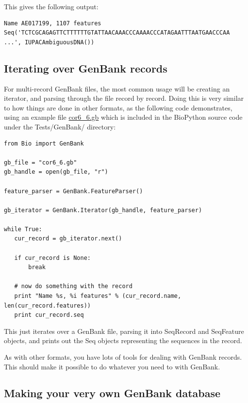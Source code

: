 \documentclass{report}
\begin{document}
This gives the following output:

\begin{verbatim}
Name AE017199, 1107 features
Seq('TCTCGCAGAGTTCTTTTTTGTATTAACAAACCCAAAACCCATAGAATTTAATGAACCCAA ...', IUPACAmbiguousDNA())
\end{verbatim}

\subsection{Iterating over GenBank records}
\label{sec:gb-parsing-iterator}

For multi-record GenBank files, the most common usage will be creating an iterator, and parsing through the file record by record. Doing this is very similar to how things are done in other formats, as the following code demonstrates, using an example file \href{http://cvs.biopython.org/cgi-bin/viewcvs/viewcvs.cgi/*checkout*/biopython/Tests/GenBank/cor6_6.gb?rev=HEAD&cvsroot=biopython&content-type=text/plain}{cor6\_6.gb} which is included in the BioPython source code under the Tests/GenBank/ directory:

\begin{verbatim}
from Bio import GenBank

gb_file = "cor6_6.gb"
gb_handle = open(gb_file, "r")

feature_parser = GenBank.FeatureParser()

gb_iterator = GenBank.Iterator(gb_handle, feature_parser)

while True:
   cur_record = gb_iterator.next()

   if cur_record is None:
       break

   # now do something with the record
   print "Name %s, %i features" % (cur_record.name, len(cur_record.features))
   print cur_record.seq
\end{verbatim}

This just iterates over a GenBank file, parsing it into SeqRecord and SeqFeature objects, and prints out the Seq objects representing the sequences in the record.

As with other formats, you have lots of tools for dealing with GenBank records. This should make it possible to do whatever you need to with GenBank.

\subsection{Making your very own GenBank database}
\end{document}
